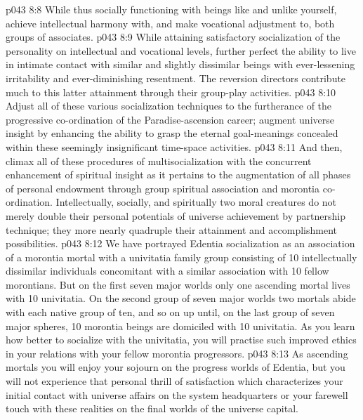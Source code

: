 \vs p043 8:8 \bibnobreakspace While thus socially functioning with beings like and unlike yourself, achieve intellectual harmony with, and make vocational adjustment to, both groups of associates.
\vs p043 8:9 \bibnobreakspace While attaining satisfactory socialization of the personality on intellectual and vocational levels, further perfect the ability to live in intimate contact with similar and slightly dissimilar beings with ever\hyp{}lessening irritability and ever\hyp{}diminishing resentment. The reversion directors contribute much to this latter attainment through their group\hyp{}play activities.
\vs p043 8:10 \bibnobreakspace Adjust all of these various socialization techniques to the furtherance of the progressive co\hyp{}ordination of the Paradise\hyp{}ascension career; augment universe insight by enhancing the ability to grasp the eternal goal\hyp{}meanings concealed within these seemingly insignificant time\hyp{}space activities.
\vs p043 8:11 \bibnobreakspace And then, climax all of these procedures of multisocialization with the concurrent enhancement of spiritual insight as it pertains to the augmentation of all phases of personal endowment through group spiritual association and morontia co\hyp{}ordination. Intellectually, socially, and spiritually two moral creatures do not merely double their personal potentials of universe achievement by partnership technique; they more nearly quadruple their attainment and accomplishment possibilities.
\vs p043 8:12 \pc We have portrayed Edentia socialization as an association of a morontia mortal with a univitatia family group consisting of 10 intellectually dissimilar individuals concomitant with a similar association with 10 fellow morontians. But on the first seven major worlds only one ascending mortal lives with 10 univitatia. On the second group of seven major worlds two mortals abide with each native group of ten, and so on up until, on the last group of seven major spheres, 10 morontia beings are domiciled with 10 univitatia. As you learn how better to socialize with the univitatia, you will practise such improved ethics in your relations with your fellow morontia progressors.
\vs p043 8:13 As ascending mortals you will enjoy your sojourn on the progress worlds of Edentia, but you will not experience that personal thrill of satisfaction which characterizes your initial contact with universe affairs on the system headquarters or your farewell touch with these realities on the final worlds of the universe capital.
